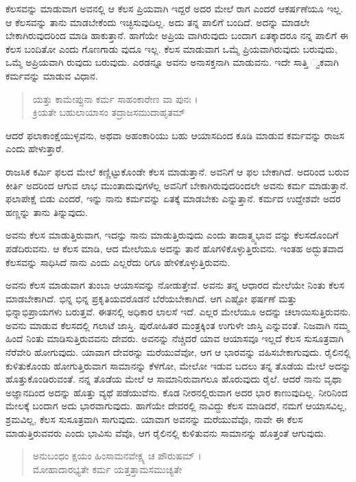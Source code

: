 ಕೆಲಸವನ್ನು ಮಾಡುವಾಗ ಅವನಲ್ಲಿ ಆ ಕೆಲಸ ಪ್ರಿಯವಾಗಿ ಇದ್ದರೆ ಅದರ ಮೇಲೆ ರಾಗ ಎಂದರೆ ಆಕರ್ಷಣೆಯೂ ಇಲ್ಲ. ಆ ಕೆಲಸವನ್ನು ತಾನು ಮಾಡಬೇಕೆಂದು ಇಚ್ಛಿಸುವುದಿಲ್ಲ. ಅದು ತನ್ನ ಪಾಲಿಗೆ ಬಂದಿದೆ. ಅದನ್ನು ಮಾಡಲೇ ಬೇಕಾಗಿರುವುದರಿಂದ ಮಾಡಿ ಹಾಕುತ್ತಾನೆ. ಹಾಗೆಯೇ ಅಪ್ರಿಯ ವಾಗಿರುವುದು ಬಂದಾಗ ಏತಕ್ಕಾದರೂ ನನ್ನ ಪಾಲಿಗೆ ಈ ಕೆಲಸ ಬಂದಿತೋ ಎಂದು ಗೊಣಗಾಡು ವುದೂ ಇಲ್ಲ. ಕೆಲಸ ಮಾಡುವಾಗ ಒಮ್ಮೆ ಪ್ರಿಯವಾಗಿರುವುದು ಬರುವುದು, ಒಮ್ಮೆ ಅಪ್ರಿಯವಾಗಿ ರುವುದು ಬರುವುದು. ಎರಡನ್ನೂ ಅವನು ಅನಾಸಕ್ತನಾಗಿ ಮಾಡುವನು. ಇದೇ ಸಾತ್ತಿ ್ವಕವಾಗಿ ಕರ್ಮವನ್ನು ಮಾಡುವ ವಿಧಾನ.

\begin{verse}
ಯತ್ತು ಕಾಮೇಪ್ಸುನಾ ಕರ್ಮ ಸಾಹಂಕಾರೇಣ ವಾ ಪುನಃ ।\\ಕ್ರಿಯತೇ ಬಹುಲಾಯಾಸಂ ತದ್ರಾಜಸಮುದಾಹೃತಮ್ 
\end{verse}

{\small ಆದರೆ ಫಲಾಕಾಂಕ್ಷೆಯುಳ್ಳವನು, ಅಥವಾ ಅಹಂಕಾರಿಯು ಬಹು ಆಯಾಸದಿಂದ ಕೂಡಿ ಮಾಡುವ ಕರ್ಮವನ್ನು ರಾಜಸ ಎಂದು ಹೇಳುತ್ತಾರೆ.}

ರಾಜಸಿಕ ಕರ್ಮಿ ಫಲದ ಮೇಲೆ ಕಣ್ಣಿಟ್ಟುಕೊಂಡೇ ಕೆಲಸ ಮಾಡುತ್ತಾನೆ. ಅವನಿಗೆ ಆ ಫಲ ಬೇಕಾಗಿದೆ. ಅದರಿಂದ ಬರುವ ಕೀರ್ತಿ ಅದರಿಂದ ಆಗುವ ಲಾಭ ಮುಂತಾದುವುಗಳೆಲ್ಲ ಅವನಿಗೆ ಬೇಕಾಗಿರುವುದರಿಂದಲೇ ಅವನು ಕರ್ಮ ಮಾಡುತ್ತಾನೆ. ಫಲಾಪೇಕ್ಷೆ ಬಿಡು ಎಂದರೆ, ಇನ್ನು ನಾನು ಕರ್ಮವನ್ನು ಏತಕ್ಕೆ ಮಾಡಬೇಕು ಎನ್ನುತ್ತಾನೆ. ಕರ್ಮದ ಉದ್ದೇಶವೇ ಅದರ ಹಣ್ಣನ್ನು ತಾನು ತಿನ್ನುವುದು.

ಅವನು ಕೆಲಸ ಮಾಡುತ್ತಿರುವಾಗ, ಇದನ್ನು ನಾನು ಮಾಡುತ್ತಿರುವುದು ಎಂದು ತಾದಾತ್ಮ್ಯಭಾವ ವನ್ನು ಕೆಲಸದೊಂದಿಗೆ ಪಡೆದಿರುವನು. ಆ ಕೆಲಸ ಮಾಡಿ, ಆದ ಮೇಲೆಯೂ ಅದನ್ನು ತಾನೆ ಹೊಗಳಿಕೊಳ್ಳುತ್ತಿರುವನು. ಇಂತಹ ಅದ್ಭುತವಾದ ಕೆಲಸವನ್ನು ಸಾಧಿಸಿದೆ ನಾನು ಎಂದು ಎಲ್ಲರೆದು ರಿಗೂ ಹೇಳಿಕೊಳ್ಳುತ್ತಿರುವನು.

ಅವನು ಕೆಲಸ ಮಾಡುವಾಗ ತುಂಬಾ ಆಯಾಸವನ್ನು ನೋಡುತ್ತೇವೆ. ಅವನು ತನ್ನ ಆಧಾರದ ಮೇಲೆಯೇ ನಿಂತು ಕೆಲಸ ಮಾಡಬೇಕಾಗಿದೆ. ಭಿನ್ನ ಭಿನ್ನ ಪ್ರಕೃತಿಯವರೊಡನೆ ಬೆರೆಯಬೇಕಾಗಿದೆ. ಆಗ ಎಷ್ಟೋ ಫರ್ಷಣೆ ಮತ್ತು ಭಿನ್ನಾಭಿಪ್ರಾಯಗಳು ಬರುತ್ತವೆ. ಈತನಲ್ಲಿ ಅಧಿಕಾರ ಲಾಲಸೆ ಇದೆ. ಎಲ್ಲರ ಮೇಲೆಯೂ ಅದನ್ನು ಚಲಾಯಿಸುತ್ತಿರುವನು. ಅವನು ಮಾಡುವ ಕೆಲಸದಲ್ಲಿ ಗಲಾಟೆ ಜಾಸ್ತಿ. ಪುರೋಹಿತರ ಮಂತ್ರಕ್ಕಿಂತ ಉಗುಳೇ ಜಾಸ್ತಿ ಎನ್ನುವಂತೆ. ನಿಜವಾಗಿ ನಮ್ಮ ಹಿಂದೆ ನಿಂತು ಮಾಡಿಸುತ್ತಿರುವವನು ದೇವರು. ಅವನನ್ನು ನೆಚ್ಚಿದರೆ ಯಾವ ಆಯಾಸವೂ ಇಲ್ಲದೆ ಕೆಲಸ ಸುಸೂತ್ರವಾಗಿ ನೆರೆವೇರಿ ಹೋಗುವುದು. ಯಾವಾಗ ದೇವರನ್ನು ಮರೆಯುವೆವೋ, ಆಗ ಆ ಭಾರವನ್ನು ವಹಿಸಬೇಕಾಗುವುದು. ರೈಲಿನಲ್ಲಿ ಕುಳಿತುಕೊಂಡು ಹೋಗುತ್ತಿರುವಾಗ ಸಾಮಾನನ್ನು ಕೆಳಗೋ, ಮೇಲೋ ಇಡುವ ಬದಲು ತನ್ನ ತೊಡೆಯ ಮೇಲೆ ಅದನ್ನು ಹೊತ್ತುಕೊಂಡಿರುವಂತೆ. ನನ್ನ ತೊಡೆಯ ಮೇಲೆ ಆ ಸಾಮಾನಿರುವಾಗಲೂ ಹೊರುವುದು ರೈಲೆ. ಆದರೆ ನಾನು ವೃಥಾ ಅಜ್ಞಾನದಿಂದ ಅದನ್ನು ಹೊತ್ತು ವ್ಯಥೆ ಪಡೆಯುವೆನು. ಕೊಡ ನೀರನಲ್ಲಿರುವಾಗ ಅದರ ಭಾರ ಕಾಣುವುದಿಲ್ಲ. ನೀರಿನಿಂದ ಮೇಲಕ್ಕೆ ಬಂದಾಗ ಅದು ಭಾರವಾಗುವುದು. ಹಾಗೆಯೇ ದೇವರಲ್ಲಿ ನಾವಿದ್ದು ಕೆಲಸ ಮಾಡಿದರೆ, ನಮಗೆ ಆಯಾಸವಿಲ್ಲ, ಶ್ರಮವಿಲ್ಲ, ಕೆಲಸ ಸುಸೂತ್ರವಾಗಿ ಸಾಗುವುದು. ಯಾವಾಗ ಅವನನ್ನು ಮರೆಯುವೆವೊ, ನಾವೇ ಈ ಕೆಲಸ ಮಾಡುತ್ತಿರುವವರು ಎಂದು ಭಾವಿಸು ವೆವೊ, ಆಗ ರೈಲಿನಲ್ಲಿ ಕುಳಿತುವನು ಸಾಮಾನನ್ನು ಹೊತ್ತಂತೆ ಆಗುವುದು.

\begin{verse}
ಅನುಬಂಧಂ ಕ್ಷಯಂ ಹಿಂಸಾಮನವೇಕ್ಷ್ಯ ಚ ಪೌರುಷಮ್ ।\\ಮೋಹಾದಾರಭ್ಯತೇ ಕರ್ಮ ಯತ್ತತ್ತಾಮಸಮುಚ್ಯತೇ 
\end{verse}

